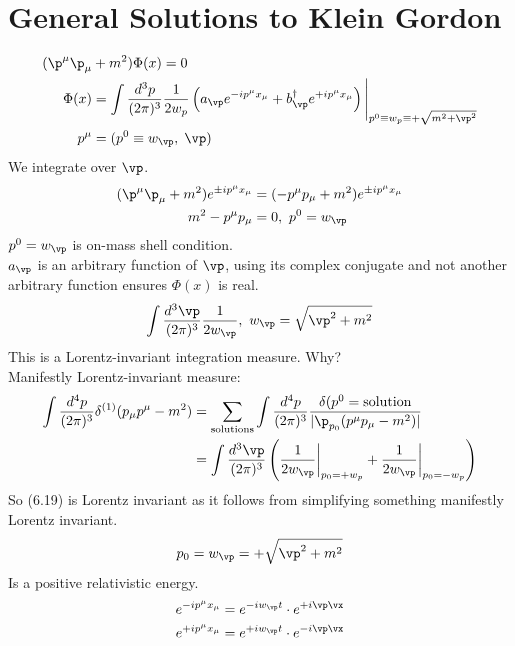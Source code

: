 \documentclass[a4paper, 11pt, normalem]{report}
\begin{document}
\section{General Solutions to Klein Gordon}
\begin{align}
    (\p^\mu\p_\mu &+ m^2)\Phi(x) = 0 \\
    \Phi(x) &= \int \frac{d^3p}{(2\pi)^3} \frac{1}{2w_p}\left(a_{\vp} e^{-ip^\mu x_\mu} + b^{\dagger}_{\vp} e^{+ip^\mu x_\mu}\right)\Bigg|_{p^0\equiv w_p\equiv +\sqrt{m^2+\vp^2}} \\
    p^\mu &= (p^0\equiv w_{\vp},\; \vp)
\end{align}
We integrate over $\vp$.
\begin{align}
    (\p^\mu\p_\mu + m^2)e^{\pm ip^\mu x_\mu} &= (-p^\mu p_\mu + m^2)e^{\pm ip^\mu x_\mu} \\
    m^2 - p^\mu p_\mu &= 0,~ p^0 = w_{\vp}
\end{align}
$p^0 = w_{\vp}$ is on-mass shell condition.\\
$a_{\vp}$ is an arbitrary function of $\vp$, using its complex conjugate and not another arbitrary function ensures $\Phi(x)$ is real.
\begin{align}
    \int \frac{d^3\vp}{(2\pi)^3} \frac{1}{2w_{\vp}},~ w_{\vp} = \sqrt{\vp^2 + m^2}
\end{align}
This is a Lorentz-invariant integration measure. Why? \\
Manifestly Lorentz-invariant measure:
\begin{align}
    \int \frac{d^4p}{(2\pi)^3} \delta^{(1)}(p_\mu p^\mu - m^2) &= \sum_{\text{solutions}} \int \frac{d^4p}{(2\pi)^3} \frac{\delta(p^0=\text{solution}}{|\p_{p_0} (p^\mu p_\mu - m^2)|} \\
                                                               &= \int \frac{d^3\vp}{(2\pi)^3} \left(\frac{1}{2w_{\vp}}\bigg|_{p_0 = +w_p} + \frac{1}{2w_{\vp}}\bigg|_{p_0=-w_p}\right)
\end{align}
So (6.19) is Lorentz invariant as it follows from simplifying something manifestly Lorentz invariant.
\begin{equation}
    p_0 = w_{\vp} = +\sqrt{\vp^2 + m^2} 
\end{equation}
Is a positive relativistic energy. 
\begin{align}
    e^{-ip^\mu x_\mu} &= e^{-iw_{\vp}t}\cdot e^{+i\vp\vx} \\
    e^{+ip^\mu x_\mu} &= e^{+iw_{\vp}t}\cdot e^{-i\vp\vx} \\
\end{align}
\end{document}
